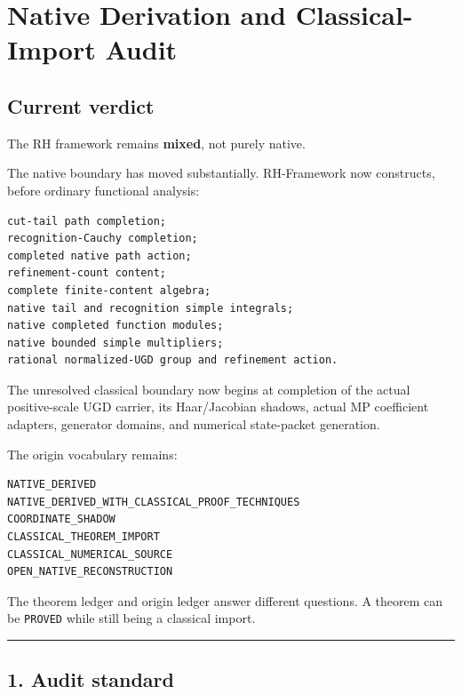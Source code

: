 \hypertarget{native-derivation-and-classical-import-audit}{%
\chapter{Native Derivation and Classical-Import Audit}\label{native-derivation-and-classical-import-audit}}

\hypertarget{current-verdict}{%
\section{Current verdict}\label{current-verdict}}

The RH framework remains \textbf{mixed}, not purely native.

The native boundary has moved substantially. RH-Framework now constructs, before
ordinary functional analysis:

\begin{verbatim}
cut-tail path completion;
recognition-Cauchy completion;
completed native path action;
refinement-count content;
complete finite-content algebra;
native tail and recognition simple integrals;
native completed function modules;
native bounded simple multipliers;
rational normalized-UGD group and refinement action.
\end{verbatim}

The unresolved classical boundary now begins at completion of the actual
positive-scale UGD carrier, its Haar/Jacobian shadows, actual MP coefficient
adapters, generator domains, and numerical state-packet generation.

The origin vocabulary remains:

\begin{verbatim}
NATIVE_DERIVED
NATIVE_DERIVED_WITH_CLASSICAL_PROOF_TECHNIQUES
COORDINATE_SHADOW
CLASSICAL_THEOREM_IMPORT
CLASSICAL_NUMERICAL_SOURCE
OPEN_NATIVE_RECONSTRUCTION
\end{verbatim}

The theorem ledger and origin ledger answer different questions. A theorem can
be \texttt{PROVED} while still being a classical import.

\begin{center}\rule{0.5\linewidth}{0.5pt}\end{center}

\hypertarget{audit-standard}{%
\section{1. Audit standard}\label{audit-standard}}

